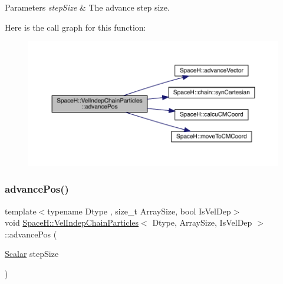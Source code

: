 \begin{DoxyParams}{Parameters}
{\em step\+Size} & The advance step size. \\
\hline
\end{DoxyParams}
Here is the call graph for this function\+:
\nopagebreak
\begin{figure}[H]
\begin{center}
\leavevmode
\includegraphics[width=350pt]{class_space_h_1_1_vel_indep_chain_particles_a647d4861878b28d79b6aab00de12ab8d_cgraph}
\end{center}
\end{figure}
\mbox{\label{class_space_h_1_1_vel_indep_chain_particles_a647d4861878b28d79b6aab00de12ab8d}} 
\subsubsection{\texorpdfstring{advance\+Pos()}{advancePos()}\hspace{0.1cm}{\footnotesize\ttfamily [2/4]}}
{\footnotesize\ttfamily template$<$typename Dtype , size\+\_\+t Array\+Size, bool Is\+Vel\+Dep$>$ \\
void \mbox{\hyperlink{class_space_h_1_1_vel_indep_chain_particles}{Space\+H\+::\+Vel\+Indep\+Chain\+Particles}}$<$ Dtype, Array\+Size, Is\+Vel\+Dep $>$\+::advance\+Pos (\begin{DoxyParamCaption}\item[{\mbox{\hyperlink{class_space_h_1_1_vel_indep_particles_aeb47d8131b30ed790320ff634f0d6af1}{Scalar}}}]{step\+Size }\end{DoxyParamCaption})\hspace{0.3cm}{\ttfamily [inline]}}



